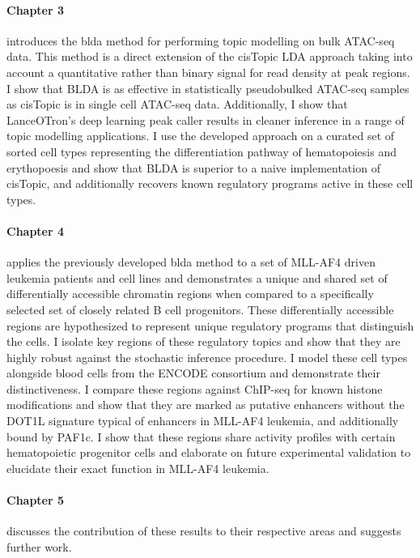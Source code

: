 \paragraph{Chapter 3} introduces the \gls{blda} method for performing topic modelling on bulk ATAC-seq data. This method is a direct extension of the cisTopic LDA approach taking into account a quantitative rather than binary signal for read density at peak regions. I show that BLDA is as effective in statistically pseudobulked ATAC-seq samples as cisTopic is in single cell ATAC-seq data. Additionally, I show that LanceOTron's deep learning peak caller results in cleaner inference in a range of topic modelling applications. I use the developed approach on a curated set of sorted cell types representing the differentiation pathway of hematopoiesis and erythopoesis and show that BLDA is superior to a naive implementation of cisTopic, and additionally recovers known regulatory programs active in these cell types.

\paragraph{Chapter 4} applies the previously developed \gls{blda} method to a set of MLL-AF4 driven leukemia patients and cell lines and demonstrates a unique and shared set of differentially accessible chromatin regions when compared to a specifically selected set of closely related B cell progenitors. These differentially accessible regions are hypothesized to represent unique regulatory programs that distinguish the cells. I isolate key regions of these regulatory topics and show that they are highly robust against the stochastic inference procedure. I model these cell types alongside blood cells from the ENCODE consortium and demonstrate their distinctiveness. I compare these regions against ChIP-seq for known histone modifications and show that they are marked as putative enhancers without the DOT1L signature typical of enhancers in MLL-AF4 leukemia, and additionally bound by PAF1c. I show that these regions share activity profiles with certain hematopoietic progenitor cells and elaborate on future experimental validation to elucidate their exact function in MLL-AF4 leukemia.  

\paragraph{Chapter 5} discusses the contribution of these results to their respective areas and suggests further work.

